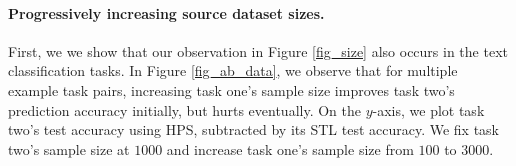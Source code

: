 \paragraph{Progressively increasing source dataset sizes.}%
First, we we show that our observation in Figure \ref{fig_size} also occurs in the text classification tasks.
In Figure \ref{fig_ab_data}, we observe that for multiple example task pairs, increasing task one's sample size improves task two's prediction accuracy initially, but hurts eventually.
On the $y$-axis, we plot task two's test accuracy using HPS, subtracted by its STL test accuracy.
We fix task two's sample size at $1000$ and increase task one's sample size from $100$ to $3000$.

